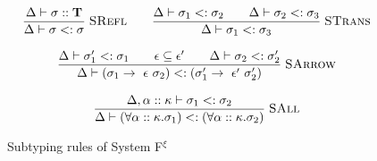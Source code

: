 \begin{figure}[p]
    \small
    \noindent{}

    \medskip
    \begin{gather*}
        \frac{\Delta \vdash \sigma :: \bold{T}}
             {\Delta \vdash \sigma <: \sigma}
             \;\textsc{SRefl}
        \qquad
        \frac{\Delta \vdash \sigma_1 <: \sigma_2
              \qquad \Delta \vdash \sigma_2 <: \sigma_3}
             {\Delta \vdash \sigma_1 <: \sigma_3}
             \;\textsc{STrans}
        \\[8pt]
        \frac{\Delta \vdash \sigma'_1 <: \sigma_1
              \qquad \epsilon \subseteq \epsilon'
              \qquad \Delta \vdash \sigma_2 <: \sigma'_2}
             {\Delta \vdash
              (\sigma_1 \rightarrow~\epsilon~\sigma_2)
              <: (\sigma'_1 \rightarrow~\epsilon'~\sigma'_2)}
             \;\textsc{SArrow}
        \\[8pt]
        \frac{\Delta,\alpha :: \kappa \vdash \sigma_1 <: \sigma_2}
             {\Delta \vdash
              (\forall\alpha :: \kappa.\sigma_1)
              <: (\forall\alpha :: \kappa.\sigma_2)}
             \;\textsc{SAll}
    \end{gather*}

    \caption{Subtyping rules of System F$^{\xi}$}
    \label{systemf:subtyping-rules}
\end{figure}
